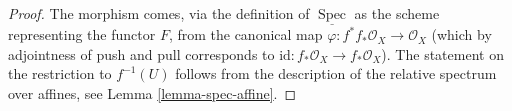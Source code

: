 \documentclass{stacks-project}
\theoremstyle{plain}
\theoremstyle{definition}
\theoremstyle{remark}
\numberwithin{equation}{subsection}
\def\Spec{\mathop{\mathrm{Spec}}}
\begin{document}
\begin{proof}
The morphism comes, via the definition of $\underline{\Spec}$
as the scheme representing the functor $F$, from the canonical map
$\varphi : f^*f_*\mathcal{O}_X \to \mathcal{O}_X$ (which by adjointness of
push and pull corresponds to
$\text{id} : f_*\mathcal{O}_X \to f_*\mathcal{O}_X$).
The statement on the restriction to $f^{-1}(U)$
follows from the description of the relative spectrum over
affines, see Lemma \ref{lemma-spec-affine}.
\end{proof}
\end{document}
